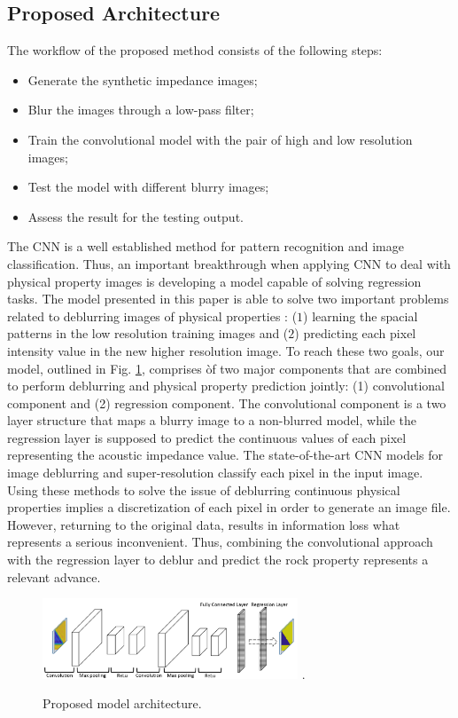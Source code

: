 \documentclass[conference]{IEEEtran}
\begin{document}
\subsection{Proposed Architecture}
The workflow of the proposed method consists of the following
steps:
\begin{itemize}
 \item Generate the synthetic impedance images;
 \item Blur the images through a low-pass filter;
 \item Train the convolutional model with the pair of high and low resolution images;
 \item Test the model with different blurry images;
 \item Assess the result for the testing output.
\end{itemize}

The CNN is a well established method for
pattern recognition and image classification.
Thus, an important breakthrough when applying CNN to
deal with physical property images is developing a model
capable of solving regression tasks. The model presented in this paper
is able to solve two important problems related to deblurring  images of physical properties
: ($1$) learning the spacial patterns in the low resolution
training images and ($2$) predicting each pixel intensity value in the new
higher resolution image. To reach these two goals, our model, outlined in Fig. \ref{fig_model},
comprises òf two major components that are combined to perform deblurring and physical property prediction
jointly: (1) convolutional component and (2) regression component. The convolutional component
is a two layer structure that maps a blurry image to a non-blurred model, while 
the regression layer is supposed to predict the continuous values of each pixel
representing the acoustic impedance value. 
The state-of-the-art CNN models for image deblurring \cite{Grigorios2017} and super-resolution \cite{Dahl2017}
classify each pixel in the input image. 
Using these methods to solve the issue of deblurring continuous physical properties 
implies a discretization of each pixel in order to generate an image file. However, returning
to the original data, results in information loss what represents a serious inconvenient.
Thus, combining the convolutional approach with the regression layer to deblur and predict
the rock property represents a relevant advance.
\begin{figure}[!t]
\centering
\includegraphics[width=3.0in]{Figs/model}
\DeclareGraphicsExtensions.
\caption{Proposed model architecture.}
\label{fig_model}
\end{figure}
\end{document}
